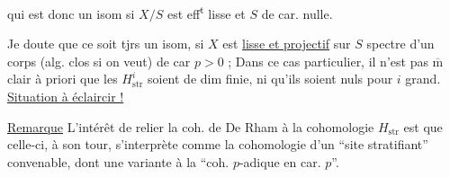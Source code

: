 qui est donc un isom si $X/S$ est eff\textsuperscript{t} lisse et $S$ de car. nulle.

Je doute que ce soit tjrs un isom,  si $X$ est \uline{lisse et projectif}  sur $S$ spectre d'un corps (alg. clos si on veut) de car $p>0$ ;  Dans ce cas particulier, il n'est pas $\overline{\mathrm m}$ clair à priori que les $H^i_{\mathrm{str}}$ soient de dim finie, ni qu'ils soient nuls pour $i$ grand.
\uline{Situation à éclaircir !}

\uline{Remarque} L'intérêt de relier la coh. de De Rham à la cohomologie  $H_{\mathrm{str}}$ est que celle-ci, à son tour, s'interprète comme la cohomologie d'un ``site stratifiant'' convenable, dont une variante   à la ``coh. $p$-adique en car. $p$''.
